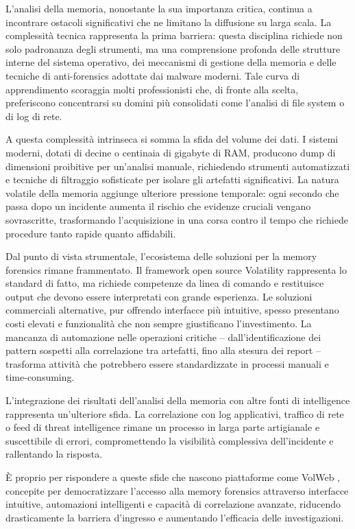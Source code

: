 L'analisi della memoria, nonostante la sua importanza critica, continua a incontrare ostacoli significativi che ne limitano la diffusione su larga scala. La complessità tecnica rappresenta la prima barriera: questa disciplina richiede non solo padronanza degli strumenti, ma una comprensione profonda delle strutture interne del sistema operativo, dei meccanismi di gestione della memoria e delle tecniche di anti-forensics adottate dai malware moderni. Tale curva di apprendimento scoraggia molti professionisti che, di fronte alla scelta, preferiscono concentrarsi su domini più consolidati come l'analisi di file system o di log di rete.

A questa complessità intrinseca si somma la sfida del volume dei dati. I sistemi moderni, dotati di decine o centinaia di gigabyte di RAM, producono dump di dimensioni proibitive per un'analisi manuale, richiedendo strumenti automatizzati e tecniche di filtraggio sofisticate per isolare gli artefatti significativi. La natura volatile della memoria aggiunge ulteriore pressione temporale: ogni secondo che passa dopo un incidente aumenta il rischio che evidenze cruciali vengano sovrascritte, trasformando l'acquisizione in una corsa contro il tempo che richiede procedure tanto rapide quanto affidabili.

Dal punto di vista strumentale, l'ecosistema delle soluzioni per la memory forensics rimane frammentato. Il framework open source Volatility rappresenta lo standard di fatto, ma richiede competenze da linea di comando e restituisce output che devono essere interpretati con grande esperienza. Le soluzioni commerciali alternative, pur offrendo interfacce più intuitive, spesso presentano costi elevati e funzionalità che non sempre giustificano l'investimento. La mancanza di automazione nelle operazioni critiche – dall'identificazione dei pattern sospetti alla correlazione tra artefatti, fino alla stesura dei report – trasforma attività che potrebbero essere standardizzate in processi manuali e time-consuming.

L'integrazione dei risultati dell'analisi della memoria con altre fonti di intelligence rappresenta un'ulteriore sfida. La correlazione con log applicativi, traffico di rete o feed di threat intelligence rimane un processo in larga parte artigianale e suscettibile di errori, compromettendo la visibilità complessiva dell'incidente e rallentando la risposta.

È proprio per rispondere a queste sfide che nascono piattaforme come VolWeb \cite{volweb2024}, concepite per democratizzare l'accesso alla memory forensics attraverso interfacce intuitive, automazioni intelligenti e capacità di correlazione avanzate, riducendo drasticamente la barriera d'ingresso e aumentando l'efficacia delle investigazioni.

